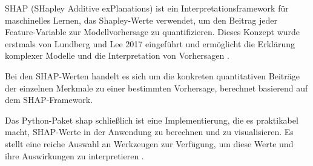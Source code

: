 SHAP (SHapley Additive exPlanations) ist ein Interpretationsframework für maschinelles Lernen, 
das Shapley-Werte verwendet, um den Beitrag jeder Feature-Variable zur Modellvorhersage 
zu quantifizieren. Dieses Konzept wurde erstmals von Lundberg und Lee 2017 eingeführt und 
ermöglicht die Erklärung komplexer Modelle und die Interpretation von Vorhersagen \cite[S. 1]{NIPS2017_8a20a862}.

Bei den SHAP-Werten handelt es sich um die konkreten quantitativen Beiträge der einzelnen Merkmale 
zu einer bestimmten Vorhersage, berechnet basierend auf dem SHAP-Framework.

Das Python-Paket \textsf{shap} schließlich ist eine Implementierung, die es praktikabel macht, SHAP-Werte in der Anwendung zu berechnen 
und zu visualisieren. Es stellt eine reiche Auswahl an Werkzeugen zur Verfügung, um diese Werte und ihre Auswirkungen zu interpretieren \cite[S. 14]{Molnar_2023}.